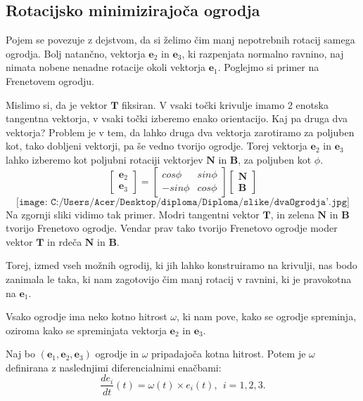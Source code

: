\documentclass[mat1]{fmfdelo}
\newcommand{\e}{\boldsymbol e}
\newcommand{\TT}{\boldsymbol T}
\newcommand{\NN}{\boldsymbol N}
\newcommand{\BB}{\boldsymbol B}
\begin{document}
\subsection{Rotacijsko minimizirajoča ogrodja} Pojem se povezuje z dejstvom, da si želimo čim manj nepotrebnih rotacij samega ogrodja. Bolj natančno, vektorja $\e_2$ in $\e_3$, ki razpenjata normalno ravnino, naj nimata nobene nenadne rotacije okoli vektorja $\e_1$. Poglejmo si primer na Frenetovem ogrodju.
\begin{primer}
	Mislimo si, da je vektor $\TT$ fiksiran. V vsaki točki krivulje imamo 2 enotska tangentna vektorja, v vsaki točki izberemo enako orientacijo. Kaj pa druga dva vektorja? Problem je v tem, da lahko druga dva vektorja zarotiramo za poljuben kot, tako dobljeni vektorji, pa še vedno tvorijo ogrodje. Torej vektorja $\e_2$ in $\e_3$ lahko izberemo kot poljubni rotaciji vektorjev $\NN$ in $\BB$, za poljuben kot $\phi$.
	\begin{equation*}
		\begin{bmatrix}
		\e_2 \\
		\e_3
		\end{bmatrix}
		=
		\begin{bmatrix}
		cos \phi & sin \phi \\
		-sin \phi & cos \phi
		\end{bmatrix}
		\begin{bmatrix}
		\NN \\ \BB
		\end{bmatrix}
	\end{equation*}
\begin{equation*}
\texttt{[image: C:/Users/Acer/Desktop/diploma/Diploma/slike/dvaOgrodja'.jpg]}
\end{equation*}
Na zgornji sliki vidimo tak primer. Modri tangentni vektor $\TT$, in zelena $\NN$ in $\BB$ tvorijo Frenetovo ogrodje. Vendar prav tako tvorijo Frenetovo ogrodje moder vektor $\TT$ in rdeča $\NN$ in $\BB$.
\end{primer}
Torej, izmed vseh možnih ogrodij, ki jih lahko konstruiramo na krivulji, nas bodo zanimala le taka, ki nam zagotovijo čim manj rotacij v ravnini, ki je pravokotna  na $\e_1$.
 
Vsako ogrodje ima neko kotno hitrost $\omega$, ki nam pove, kako se ogrodje spreminja, oziroma kako se spreminjata vektorja $\e_2$ in $\e_3$.
\begin{definicija}
Naj bo $(\e_1,\e_2,\e_3)$ ogrodje in $\omega$ pripadajoča kotna hitrost. Potem je $\omega$ definirana z naslednjimi diferencialnimi enačbami:
\begin{equation}
\frac{de_i}{dt}(t) = \omega(t) \times e_i(t), ~~ i=1,2,3.
\end{equation}
\end{definicija}
\end{document}
